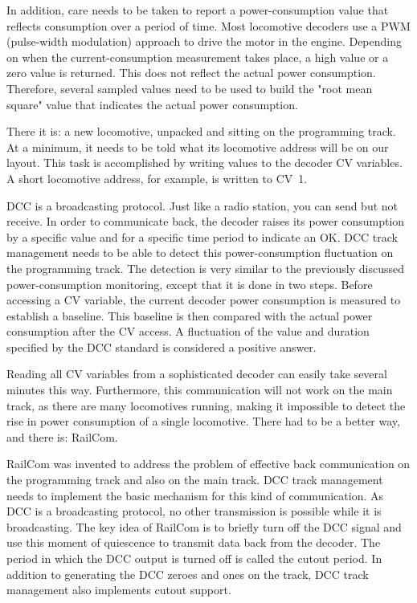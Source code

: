 In addition, care needs to be taken to report a power-consumption value that reflects consumption over a period of time. Most locomotive decoders use a PWM (pulse-width modulation) approach to drive the motor in the engine. Depending on when the current-consumption measurement takes place, a high value or a zero value is returned. This does not reflect the actual power consumption. Therefore, several sampled values need to be used to build the "root mean square" value that indicates the actual power consumption.


There it is: a new locomotive, unpacked and sitting on the programming track. At a minimum, it needs to be told what its locomotive address will be on our layout. This task is accomplished by writing values to the decoder CV variables. A short locomotive address, for example, is written to CV~1.

DCC is a broadcasting protocol. Just like a radio station, you can send but not receive. In order to communicate back, the decoder raises its power consumption by a specific value and for a specific time period to indicate an OK. DCC track management needs to be able to detect this power-consumption fluctuation on the programming track. The detection is very similar to the previously discussed power-consumption monitoring, except that it is done in two steps. Before accessing a CV variable, the current decoder power consumption is measured to establish a baseline. This baseline is then compared with the actual power consumption after the CV access. A fluctuation of the value and duration specified by the DCC standard is considered a positive answer.

Reading all CV variables from a sophisticated decoder can easily take several minutes this way. Furthermore, this communication will not work on the main track, as there are many locomotives running, making it impossible to detect the rise in power consumption of a single locomotive. There had to be a better way, and there is: RailCom.


RailCom was invented to address the problem of effective back communication on the programming track and also on the main track. DCC track management needs to implement the basic mechanism for this kind of communication. As DCC is a broadcasting protocol, no other transmission is possible while it is broadcasting. The key idea of RailCom is to briefly turn off the DCC signal and use this moment of quiescence to transmit data back from the decoder. The period in which the DCC output is turned off is called the cutout period. In addition to generating the DCC zeroes and ones on the track, DCC track management also implements cutout support.

